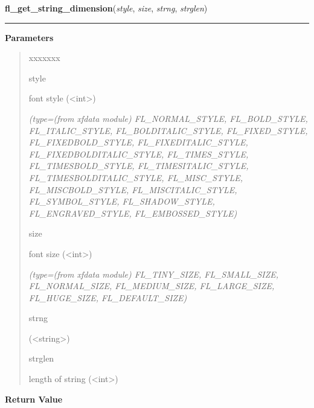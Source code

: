 \hspace{.8\funcindent}\begin{boxedminipage}{\funcwidth}

    \raggedright \textbf{fl\_get\_string\_dimension}(\textit{style}, \textit{size}, \textit{strng}, \textit{strglen})

    \vspace{-1.5ex}

    \rule{\textwidth}{0.5\fboxrule}
\setlength{\parskip}{2ex}
\setlength{\parskip}{1ex}
      \textbf{Parameters}
      \vspace{-1ex}

      \begin{quote}
        \begin{Ventry}{xxxxxxx}

          \item[style]

          font style ({\textless}int{\textgreater})

            {\it (type=(from xfdata module) FL\_NORMAL\_STYLE, FL\_BOLD\_STYLE, FL\_ITALIC\_STYLE,
FL\_BOLDITALIC\_STYLE, FL\_FIXED\_STYLE, FL\_FIXEDBOLD\_STYLE, 
FL\_FIXEDITALIC\_STYLE, FL\_FIXEDBOLDITALIC\_STYLE, FL\_TIMES\_STYLE, 
FL\_TIMESBOLD\_STYLE, FL\_TIMESITALIC\_STYLE, FL\_TIMESBOLDITALIC\_STYLE, 
FL\_MISC\_STYLE, FL\_MISCBOLD\_STYLE, FL\_MISCITALIC\_STYLE, 
FL\_SYMBOL\_STYLE, FL\_SHADOW\_STYLE, FL\_ENGRAVED\_STYLE, 
FL\_EMBOSSED\_STYLE)}

          \item[size]

          font size ({\textless}int{\textgreater})

            {\it (type=(from xfdata module) FL\_TINY\_SIZE, FL\_SMALL\_SIZE, FL\_NORMAL\_SIZE, 
FL\_MEDIUM\_SIZE, FL\_LARGE\_SIZE, FL\_HUGE\_SIZE, FL\_DEFAULT\_SIZE)}

          \item[strng]

          ({\textless}string{\textgreater})

          \item[strglen]

          length of string ({\textless}int{\textgreater})

        \end{Ventry}

      \end{quote}

      \textbf{Return Value}
    \vspace{-1ex}


\end{boxedminipage}
